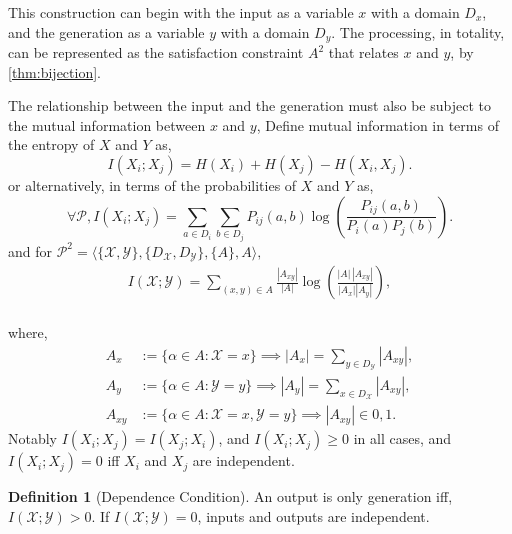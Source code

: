 \documentclass[stu,12pt]{apa7}
\theoremstyle{definition}
\newtheorem{definition}{Definition}[section]
\begin{document}
This construction can begin with the input as a variable $x$ with a domain $D_x$, and the generation as a variable $y$ with a domain $D_y$. The processing, in totality, can be represented as the satisfaction constraint $A^2$ that relates $x$ and $y$, by \ref{thm:bijection}.

The relationship between the input and the generation must also be subject to the mutual information between $x$ and $y$,
Define mutual information in terms of the entropy of $X$ and $Y$ as,
\[I(X_i;X_j) = H(X_i) + H(X_j) - H(X_i,X_j).
\]
or alternatively, in terms of the probabilities of $X$ and $Y$ as,
\[
\forall \mathcal{P}, I(X_i;X_j) = \underset{a \in D_i}{\sum}\underset{b \in D_j}{\sum}P_{ij}(a,b) \log\left(\frac{P_{ij}(a,b)}{P_i(a)P_j(b)}\right).
\]
and for \(
\mathcal{P}^2 = \langle \{\mathcal{X},\mathcal{Y}\},\{D_\mathcal{X},D_\mathcal{Y}\},\{A\},A\rangle,
\)
\[
    \begin{aligned}
        I(\mathcal{X};\mathcal{Y})
        = 
        \sum_{(x,y) \in A}
        \frac{|A_{xy}|}{|A|}
        \log\!\left(\frac{|A|\,|A_{xy}|}{|A_x||A_y|}\right), \\
    \end{aligned}
\]

where,
\[
    \begin{aligned}
    A_x &:= \{\alpha \in A: \mathcal{X}=x\} \implies |A_x| = \sum_{y \in D_\mathcal{Y}} |A_{xy}|, \\
    A_y &:= \{\alpha \in A: \mathcal{Y}=y\} \implies |A_y| = \sum_{x \in D_\mathcal{X}} |A_{xy}|, \\
    A_{xy} &:= \{\alpha \in A: \mathcal{X}=x, \mathcal{Y}=y\} \implies |A_{xy}| \in {0,1}.
    \end{aligned}
\]
Notably $I(X_i;X_j) = I(X_j;X_i)$, and $I(X_i;X_j) \geq 0$ in all cases, and $I(X_i;X_j) = 0 $ iff  $X_i$ and $X_j$ are independent.
\begin{definition}[Dependence Condition]
An output is only generation iff, \(I(\mathcal X;\mathcal Y) > 0\).
If \(I(\mathcal X;\mathcal Y)=0\), inputs and outputs are independent.
\end{definition}
\end{document}
